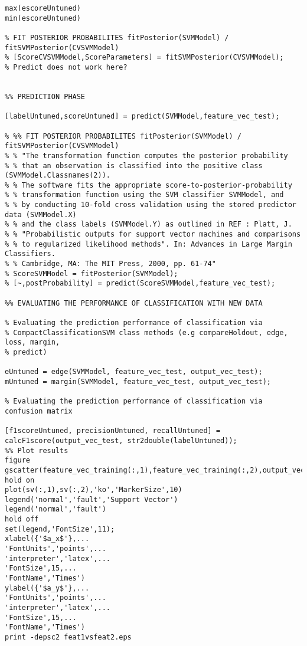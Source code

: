 \begin{lstlisting}
max(escoreUntuned)
min(escoreUntuned)

% FIT POSTERIOR PROBABILITES fitPosterior(SVMModel) / fitSVMPosterior(CVSVMModel)
% [ScoreCVSVMModel,ScoreParameters] = fitSVMPosterior(CVSVMModel);
% Predict does not work here?


%% PREDICTION PHASE

[labelUntuned,scoreUntuned] = predict(SVMModel,feature_vec_test);

% %% FIT POSTERIOR PROBABILITES fitPosterior(SVMModel) / fitSVMPosterior(CVSVMModel)
% % "The transformation function computes the posterior probability 
% % that an observation is classified into the positive class (SVMModel.Classnames(2)).
% % The software fits the appropriate score-to-posterior-probability 
% % transformation function using the SVM classifier SVMModel, and 
% % by conducting 10-fold cross validation using the stored predictor data (SVMModel.X) 
% % and the class labels (SVMModel.Y) as outlined in REF : Platt, J. 
% % "Probabilistic outputs for support vector machines and comparisons 
% % to regularized likelihood methods". In: Advances in Large Margin Classifiers. 
% % Cambridge, MA: The MIT Press, 2000, pp. 61-74"
% ScoreSVMModel = fitPosterior(SVMModel);
% [~,postProbability] = predict(ScoreSVMModel,feature_vec_test);

%% EVALUATING THE PERFORMANCE OF CLASSIFICATION WITH NEW DATA

% Evaluating the prediction performance of classification via
% CompactClassificationSVM class methods (e.g compareHoldout, edge, loss, margin, 
% predict)

eUntuned = edge(SVMModel, feature_vec_test, output_vec_test);
mUntuned = margin(SVMModel, feature_vec_test, output_vec_test);

% Evaluating the prediction performance of classification via confusion matrix

[f1scoreUntuned, precisionUntuned, recallUntuned] = calcF1score(output_vec_test, str2double(labelUntuned));
%% Plot results
figure
gscatter(feature_vec_training(:,1),feature_vec_training(:,2),output_vec_training)
hold on
plot(sv(:,1),sv(:,2),'ko','MarkerSize',10)
legend('normal','fault','Support Vector')
legend('normal','fault')
hold off
set(legend,'FontSize',11);
xlabel({'$a_x$'},...
'FontUnits','points',...
'interpreter','latex',...
'FontSize',15,...
'FontName','Times')
ylabel({'$a_y$'},...
'FontUnits','points',...
'interpreter','latex',...
'FontSize',15,...
'FontName','Times')
print -depsc2 feat1vsfeat2.eps

 \end{lstlisting}
 
